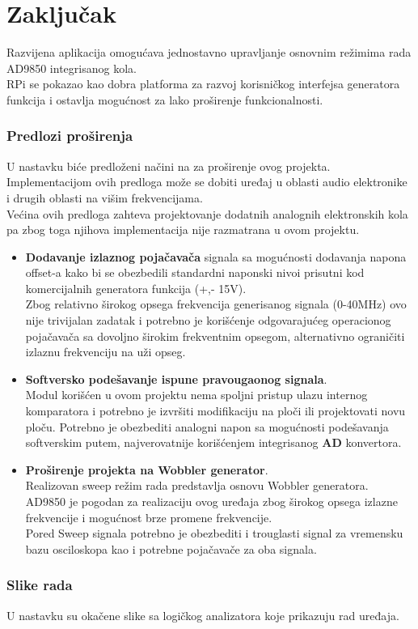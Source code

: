 \section{Zaključak}

Razvijena aplikacija omogućava jednostavno upravljanje osnovnim režimima rada
AD9850 integrisanog kola. \\
RPi se pokazao kao dobra platforma za razvoj korisničkog interfejsa generatora
funkcija i ostavlja mogućnost za lako proširenje funkcionalnosti. \\

\subsubsection{Predlozi proširenja}
U nastavku biće predloženi načini na za proširenje ovog projekta.
Implementacijom ovih predloga može se dobiti uređaj u oblasti audio elektronike
i drugih oblasti na višim frekvencijama. \\
Većina ovih predloga zahteva projektovanje dodatnih analognih
elektronskih kola pa zbog toga njihova implementacija nije razmatrana u ovom projektu. \\

\begin{itemize}
\item \textbf{Dodavanje izlaznog pojačavača} signala sa mogućnosti dodavanja napona
  offset-a kako bi se obezbedili standardni naponski nivoi prisutni kod
  komercijalnih generatora funkcija (+,- 15V). \\
  Zbog relativno širokog opsega frekvencija generisanog signala (0-40MHz) ovo
  nije trivijalan zadatak i potrebno je korišćenje odgovarajućeg operacionog
  pojačavača sa dovoljno širokim frekventnim opsegom, alternativno ograničiti
  izlaznu frekvenciju na uži opseg.

\item \textbf{Softversko podešavanje ispune pravougaonog signala}. \\
  Modul korišćen u ovom projektu nema spoljni pristup ulazu internog komparatora i
  potrebno je izvršiti modifikaciju na ploči ili projektovati novu ploču.
  Potrebno je obezbediti analogni napon sa mogućnosti podešavanja softverskim
  putem, najverovatnije korišćenjem integrisanog \textbf{AD} konvertora.

\item \textbf{Proširenje projekta na Wobbler generator}. \\
  Realizovan sweep režim rada predstavlja osnovu Wobbler generatora. \\
  AD9850 je pogodan za realizaciju ovog uređaja zbog širokog opsega izlazne
  frekvencije i mogućnost brze promene frekvencije. \\
  Pored Sweep signala potrebno je obezbediti i trouglasti signal za vremensku
  bazu osciloskopa kao i potrebne pojačavače za oba signala.

\end{itemize}

\subsubsection{Slike rada}

U nastavku su okačene slike sa logičkog analizatora koje prikazuju rad uređaja.